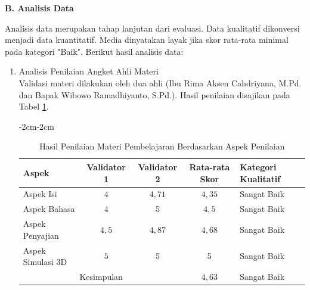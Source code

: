 \textbf{B. Analisis Data}

\hspace{1cm}Analisis data merupakan tahap lanjutan dari evaluasi. Data kualitatif dikonversi menjadi data kuantitatif. Media dinyatakan layak jika skor rata-rata minimal pada kategori "Baik". Berikut hasil analisis data:
\begin{enumerate}
    \item Analisis Penilaian Angket Ahli Materi\\
    \hspace*{1cm}Validasi materi dilakukan oleh dua ahli (Ibu Rima Aksen Cahdriyana, M.Pd. dan Bapak Wibowo Ramadhiyanto, S.Pd.). Hasil penilaian disajikan pada Tabel \ref{penilaianmateri}.
    \begin{table}[H]
        \begin{adjustwidth}{-2cm}{-2cm}
            \centering
            \caption{Hasil Penilaian Materi Pembelajaran Berdasarkan Aspek Penilaian}
            \label{penilaianmateri}
            \begin{tabular}{|l|c|c|c|l|}
                \hline
                \textbf{Aspek} & \textbf{Validator 1} & \textbf{Validator 2} & \textbf{Rata-rata Skor} & \textbf{Kategori Kualitatif}\\
                \hline
                Aspek Isi & \(4\) & \(4{,}71\) & \(4{,}35\) & Sangat Baik\\
                Aspek Bahasa & \(4\) & 5 & \(4{,}5\) & Sangat Baik\\
                Aspek Penyajian & \(4{,}5\) & \(4{,}87\) & \(4{,}68\) & Sangat Baik\\
                Aspek Simulasi 3D & \(5\) & 5 & 5 & Sangat Baik\\
                \hline
                \multicolumn{3}{|c|}{Kesimpulan} & \(4{,}63\) & Sangat Baik\\
                \hline
            \end{tabular}
        \end{adjustwidth}
    \end{table}


\end{enumerate}
